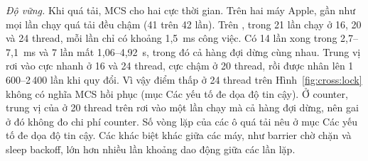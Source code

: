 \emph{Độ vững.} Khi quá tải, MCS cho hai cực thời gian. Trên hai máy Apple, gần như mọi lần chạy quá tải
đều chậm (41 trên 42 lần). Trên , trong 21 lần chạy ở 16, 20 và 24 thread, mỗi lần chỉ có
khoảng 1,5~ms công việc. Có 14 lần xong trong 2,7--7,1~ms và 7 lần mất 1,06--4,92~s, trong đó cả hàng đợi
dừng cùng nhau. Trung vị rơi vào cực nhanh ở 16 và 24 thread, cực chậm ở 20 thread, rồi được nhân lên
1\,600--2\,400 lần khi quy đổi. Vì vậy điểm thấp ở 24 thread trên Hình~\ref{fig:cross:lock} không có nghĩa
MCS hồi phục (mục Các yếu tố đe dọa độ tin cậy). Ở counter, trung vị của  ở 20 thread trên
 rơi vào một lần chạy mà cả hàng đợi dừng, nên gai ở đó không đo chi phí counter. Số
vòng lặp của các ô  quá tải nêu ở mục Các yếu tố đe dọa độ tin cậy. Các khác biệt khác
giữa các máy, như barrier chờ chặn và sleep backoff, lớn hơn nhiều lần khoảng dao động giữa các lần lặp.
